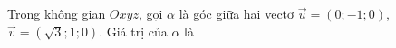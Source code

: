 \begin{ex}
Trong không gian $Oxyz$, gọi $\alpha$ là góc giữa hai vectơ $\vec u=(0;-1;0)$, $\vec v=\left(\sqrt3;1;0\right)$. Giá trị của $\alpha$ là
\end{ex}
